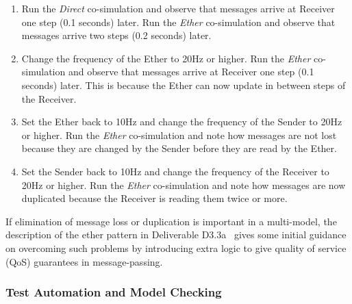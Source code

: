 \begin{enumerate}
  \item Run the \emph{Direct} co-simulation and observe that messages arrive at Receiver one step (0.1 seconds) later. Run the \emph{Ether} co-simulation and observe that messages arrive two steps (0.2 seconds) later.
  \item Change the frequency of the Ether to 20Hz or higher. Run the \emph{Ether} co-simulation and observe that messages arrive at Receiver one step (0.1 seconds) later. This is because the Ether can now update in between steps of the Receiver.
  \item Set the Ether back to 10Hz and change the frequency of the Sender to 20Hz or higher. Run the \emph{Ether} co-simulation and note how messages are not lost because they are changed by the Sender before they are read by the Ether.
  \item Set the Sender back to 10Hz and change the frequency of the Receiver to 20Hz or higher. Run the \emph{Ether} co-simulation and note how messages are now duplicated because the Receiver is reading them twice or more.
\end{enumerate}

If elimination of message loss or duplication is important in a multi-model,
the description of the ether pattern in Deliverable D3.3a~\cite{INTOCPSD3.3a} gives some initial guidance on overcoming such problems by introducing extra logic to give quality of service (QoS) guarantees in message-passing. 


\subsubsection{Test Automation and Model Checking}
\label{sec:ether_ta}
\graphicspath{ {./ether/TA/} }

